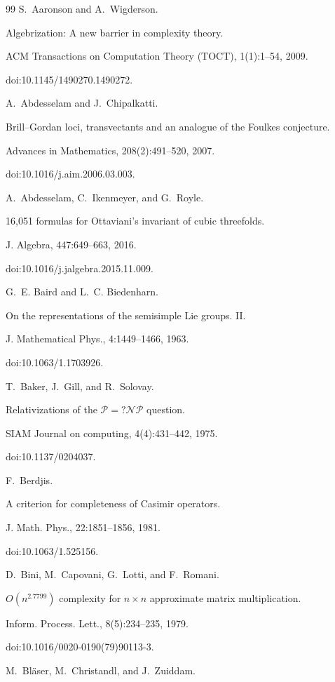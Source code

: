 \begin{thebibliography}{99}
S. Aaronson and A. Wigderson.


Algebrization: A new barrier in complexity theory.


ACM Transactions on Computation Theory (TOCT), 1(1):1–54,
2009.


doi:10.1145/1490270.1490272.

A. Abdesselam and J. Chipalkatti.


Brill–Gordan loci, transvectants and an analogue of the Foulkes
conjecture.


Advances in Mathematics, 208(2):491–520, 2007.


doi:10.1016/j.aim.2006.03.003.

A. Abdesselam, C. Ikenmeyer, and G. Royle.


16,051 formulas for Ottaviani’s invariant of cubic threefolds.


J. Algebra, 447:649–663, 2016.


doi:10.1016/j.jalgebra.2015.11.009.

G. E. Baird and L. C. Biedenharn.


On the representations of the semisimple Lie groups. II.


J. Mathematical Phys., 4:1449–1466, 1963.


doi:10.1063/1.1703926.

T. Baker, J. Gill, and R. Solovay.


Relativizations of the $\mathcal{P}=?\mathcal{NP}$ question.


SIAM Journal on computing, 4(4):431–442, 1975.


doi:10.1137/0204037.

F. Berdjis.


A criterion for completeness of Casimir operators.


J. Math. Phys., 22:1851–1856, 1981.


doi:10.1063/1.525156.

D. Bini, M. Capovani, G. Lotti, and F. Romani.


$O(n^{2.7799})$ complexity for $n\times{}n$ approximate matrix
multiplication.


Inform. Process. Lett., 8(5):234–235, 1979.


doi:10.1016/0020-0190(79)90113-3.

M. Bläser, M. Christandl, and J. Zuiddam.



\end{thebibliography}
